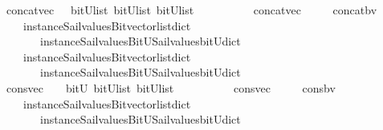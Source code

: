 \begin{isabellebody}
\isanewline
\isanewline
%
\isanewline
{}\isamarkupfalse%
\ concat{\isacharunderscore}vec\ \ {\isacharcolon}{\isacharcolon}\ {\isachardoublequoteopen}{\isacharparenleft}bitU{\isacharparenright}list\ {\isasymRightarrow}{\isacharparenleft}bitU{\isacharparenright}list\ {\isasymRightarrow}{\isacharparenleft}bitU{\isacharparenright}list\ {\isachardoublequoteclose}\ \ \ \isanewline
\ \ \ \ \ {\isachardoublequoteopen}\ concat{\isacharunderscore}vec\ {\isacharequal}\ {\isacharparenleft}\ \isanewline
\ \ concat{\isacharunderscore}bv\isanewline
\ \ \ \ {\isacharparenleft}instance{\isacharunderscore}Sail{}{\isacharunderscore}values{\isacharunderscore}Bitvector{\isacharunderscore}list{\isacharunderscore}dict\isanewline
\ \ \ \ \ \ \ instance{\isacharunderscore}Sail{}{\isacharunderscore}values{\isacharunderscore}BitU{\isacharunderscore}Sail{}{\isacharunderscore}values{\isacharunderscore}bitU{\isacharunderscore}dict{\isacharparenright}\isanewline
\ \ \ \ {\isacharparenleft}instance{\isacharunderscore}Sail{}{\isacharunderscore}values{\isacharunderscore}Bitvector{\isacharunderscore}list{\isacharunderscore}dict\isanewline
\ \ \ \ \ \ \ instance{\isacharunderscore}Sail{}{\isacharunderscore}values{\isacharunderscore}BitU{\isacharunderscore}Sail{}{\isacharunderscore}values{\isacharunderscore}bitU{\isacharunderscore}dict{\isacharparenright}\ {\isacharparenright}{\isachardoublequoteclose}\isanewline
\isanewline
\isanewline
%
\isanewline
{}\isamarkupfalse%
\ cons{\isacharunderscore}vec\ \ {\isacharcolon}{\isacharcolon}\ {\isachardoublequoteopen}\ bitU\ {\isasymRightarrow}{\isacharparenleft}bitU{\isacharparenright}list\ {\isasymRightarrow}{\isacharparenleft}bitU{\isacharparenright}list\ {\isachardoublequoteclose}\ \ \ \isanewline
\ \ \ \ \ {\isachardoublequoteopen}\ cons{\isacharunderscore}vec\ {\isacharequal}\ {\isacharparenleft}\ \isanewline
\ \ cons{\isacharunderscore}bv\isanewline
\ \ \ \ {\isacharparenleft}instance{\isacharunderscore}Sail{}{\isacharunderscore}values{\isacharunderscore}Bitvector{\isacharunderscore}list{\isacharunderscore}dict\isanewline
\ \ \ \ \ \ \ instance{\isacharunderscore}Sail{}{\isacharunderscore}values{\isacharunderscore}BitU{\isacharunderscore}Sail{}{\isacharunderscore}values{\isacharunderscore}bitU{\isacharunderscore}dict{\isacharparenright}\ {\isacharparenright}{\isachardoublequoteclose}\isanewline

\end{isabellebody}
